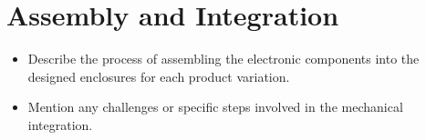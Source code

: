 \section{Assembly and Integration}
\label{sec:assembly_integration_hw}
\begin{itemize}
	\item Describe the process of assembling the electronic components into the designed enclosures for each product variation.
	\item Mention any challenges or specific steps involved in the mechanical integration.
\end{itemize}